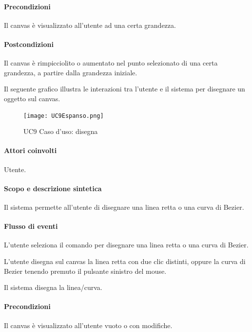 \paragraph{Precondizioni} Il canvas \`e visualizzato all'utente ad una certa grandezza.
\paragraph{Postcondizioni} Il canvas \`e rimpicciolito o aumentato nel punto selezionato di una certa grandezza, a partire dalla grandezza iniziale.
\newpage

\label{ucdisegna}
Il seguente grafico illustra le interazioni tra l'utente e il sistema per disegnare un oggetto sul canvas.

\begin{figure}[!ht]
\centering
\vspace{20pt} 
\texttt{[image: UC9Espanso.png]}
\caption{UC9 Caso d'uso: disegna}
\label{uc9}
\end{figure}


\paragraph{Attori coinvolti} Utente.
\paragraph{Scopo e descrizione sintetica} 
Il sistema permette all'utente di disegnare una linea retta o una curva di Bezier.
\paragraph{Flusso di eventi}
\begin{elenconumerato}[\textbf{}]{\subsubsecindent}
\item L'utente seleziona il comando per disegnare una linea retta o una curva di Bezier.
\item L'utente disegna sul canvas la linea retta con due clic distinti, oppure la curva di Bezier tenendo premuto il pulsante sinistro del mouse.
\item Il sistema disegna la linea/curva.
\end{elenconumerato}
\paragraph{Precondizioni} Il canvas \`e visualizzato all'utente vuoto o con modifiche.
